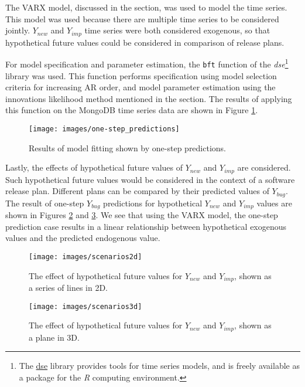 \documentclass[a4paper]{scrartcl}
\begin{document}
The VARX model, discussed in the  section, was used to model the time series. This model was used because there are multiple time series to be considered jointly. $Y_{new}$ and $Y_{imp}$ time series were both considered exogenous, so that hypothetical future values could be considered in comparison of release plans.

For model specification and parameter estimation, the \texttt{bft} function  of the \textit{dse}\footnote{The \href{http://cran.r-project.org/web/packages/dse}{dse} library provides tools for time series models, and is freely available as a package for the \textit{R} computing environment.} library was used. This function performs specification using model selection criteria for increasing AR order, and model parameter estimation using the innovations likelihood method mentioned in the  section. The results of applying this function on the MongoDB time series data are shown in Figure \ref{fig:model_fitting}. 

\begin{figure}[htbp!]
\begin{center}
\texttt{[image: images/one-step\_predictions]}
\caption{Results of model fitting shown by one-step predictions.}
\label{fig:model_fitting}
\end{center}
\end{figure}

Lastly, the effects of hypothetical future values of $Y_{new}$ and $Y_{imp}$ are considered. Such hypothetical future values would be considered in the context of a software release plan. Different plans can be compared by their predicted values of $Y_{bug}$. The result of one-step $Y_{bug}$ predictions for hypothetical $Y_{new}$ and $Y_{imp}$ values are shown in Figures \ref{fig:scenarios2d} and \ref{fig:scenarios3d}. We see that using the VARX model, the one-step prediction case results in a linear relationship between hypothetical exogenous values and the predicted endogenous value.

\begin{figure}[htbp!]
\begin{center}
\texttt{[image: images/scenarios2d]}
\caption{The effect of hypothetical future values for $Y_{new}$ and $Y_{imp}$, shown as a series of lines in 2D.}
\label{fig:scenarios2d}
\end{center}
\end{figure}

\begin{figure}[htbp!]
\begin{center}
\texttt{[image: images/scenarios3d]}
\caption{The effect of hypothetical future values for $Y_{new}$ and $Y_{imp}$, shown as a plane in 3D.}
\label{fig:scenarios3d}
\end{center}
\end{figure}
\end{document}
